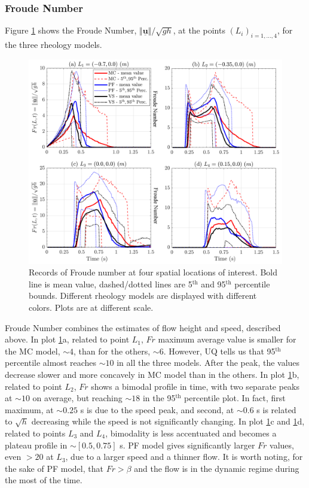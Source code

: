 \documentclass{article}
\begin{document}
\subsubsection{Froude Number}
Figure \ref{fig:Ramp-Fr} shows the Froude Number, $\Vert \underline{\mathbf{u}} \Vert/\sqrt{gh}$, at the points $(L_i)_{i=1,\dots,4}$, for the three rheology models.
\begin{figure}[H]
         \centering
        \includegraphics[width=1\textwidth]{InclinedPlane/LocalMeasurments/Froude.png}
        \caption{Records of Froude number at four spatial locations of interest. Bold line is mean value, dashed/dotted lines are 5$^{\mathrm{th}}$ and 95$^{\mathrm{th}}$ percentile bounds. Different rheology models are displayed with different colors. Plots are at different scale.}
        \label{fig:Ramp-Fr}
\end{figure}
Froude Number combines the estimates of flow height and speed, described above. In plot \ref{fig:Ramp-Fr}a, related to point $L_1$, $Fr$ maximum average value is smaller for the MC model, $\sim 4$, than for the others, $\sim 6$. However, UQ tells us that 95$^{\mathrm{th}}$ percentile almost reaches $\sim 10$ in all the three models. After the peak, the values decrease slower and more concavely in MC model than in the others. In plot \ref{fig:Ramp-Fr}b, related to point $L_2$, $Fr$ shows a bimodal profile in time, with two separate peaks at $\sim 10$ on average, but reaching $\sim 18$ in the 95$^{\mathrm{th}}$ percentile plot. In fact, first maximum, at $\sim 0.25$ s is due to the speed peak, and second, at $\sim 0.6$ s is related to $\sqrt{h}$ decreasing while the speed is not significantly changing. In plot \ref{fig:Ramp-Fr}c and \ref{fig:Ramp-Fr}d, related to points $L_3$ and $L_4$, bimodality is less accentuated and becomes a plateau profile in $\sim [0.5, 0.75]$ s. PF model gives significantly larger $Fr$ values, even $>20$ at $L_3$, due to a larger speed and a thinner flow. It is worth noting, for the sake of PF model, that $Fr>\beta$ and the flow is in the dynamic regime during the most of the time.
\end{document}
